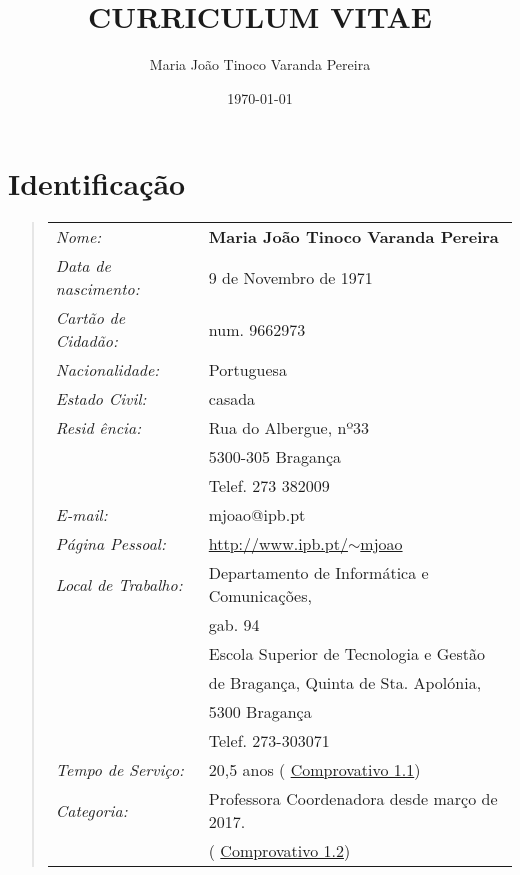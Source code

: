 \documentclass[11pt]{article}
\title{CURRICULUM VITAE \\
 
\vspace{3cm}
\vspace{3cm}}
\author{Maria João Tinoco Varanda Pereira}
\date{
\today}
\newcommand{
\daterange}[1]{#1}
\begin{document}
 
\maketitle 
\newpage
\section{Identificação} 
\begin{quote} 
\begin{tabular}{ll}
\em{Nome:}          &  
\bf{Maria João Tinoco Varanda Pereira} \\
 
\em{Data de nascimento:} & 
\daterange{9 de Novembro de 1971} \\
 
\em{Cartão de Cidadão:}  & num. 9662973 \\
 
\em{Nacionalidade:}  & Portuguesa \\

\em{Estado Civil:} & casada \\
 
\em{Resid
\^{e}ncia:}  & Rua do Albergue, nº33 \\
 & 5300-305 Bragança \\
 & Telef. 273 382009 \\
 
\em{E-mail:} & mjoao@ipb.pt \\

\em{Página Pessoal:} & 
\href{http://www.ipb.pt/~mjoao}{http://www.ipb.pt/$
\sim$mjoao} \\

\em{Local de Trabalho:} & Departamento de Informática e Comunicações, \\
&gab. 94 \\
 &Escola Superior de Tecnologia e Gestão \\
&de Bragança, Quinta de Sta. Apolónia, \\
&5300 Bragança \\
  &Telef. 273-303071 \\

\em{Tempo de Serviço:} &20,5 anos (
\href{run:Diplomas/carreira.pdf}{Comprovativo 1.1}) \\
 
\em{Categoria:} &Professora Coordenadora desde março de 2017. \\
&(
\href{run:NOVOSCOMPROVATIVOS/coordenador.pdf}{Comprovativo 1.2}) \\
 
\end{tabular} 
\end{quote} 
\newpage
\end{document}
